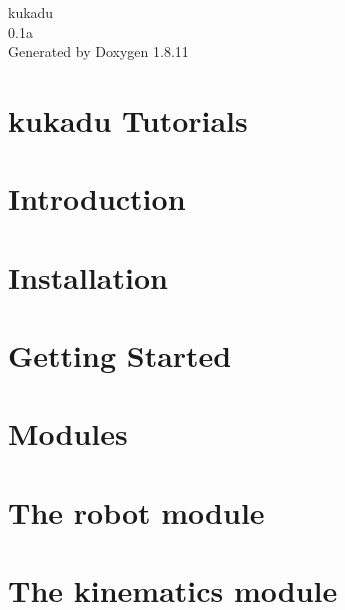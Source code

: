 \documentclass[twoside]{book}
\newcommand{\+}{\discretionary{\mbox{\scriptsize$\hookleftarrow$}}{}{}}
\newcommand{\clearemptydoublepage}{%
  \newpage{\pagestyle{empty}\cleardoublepage}%
}
\begin{document}
\hypersetup{pageanchor=false,
             bookmarksnumbered=true,
             pdfencoding=unicode
            }
\begin{titlepage}
\vspace*{7cm}
\begin{center}%
{\Large kukadu \\[1ex]\large 0.\+1a }\\
\vspace*{1cm}
{\large Generated by Doxygen 1.8.11}\\
\end{center}
\end{titlepage}
\clearemptydoublepage
\tableofcontents
\clearemptydoublepage
{}
\hypersetup{pageanchor=true}

\chapter{kukadu Tutorials}
\label{index}\hypertarget{index}{}
\chapter{Introduction}
\label{introductionpage}
\hypertarget{introductionpage}{}

\chapter{Installation}
\label{installationpage}
\hypertarget{installationpage}{}

\chapter{Getting Started}
\label{gettingstartedpage}
\hypertarget{gettingstartedpage}{}

\chapter{Modules}
\label{modulespage}
\hypertarget{modulespage}{}

\chapter{The robot module}
\label{robotpage}
\hypertarget{robotpage}{}

\chapter{The kinematics module}
\label{kinematicspage}
\hypertarget{kinematicspage}{}

\end{document}
